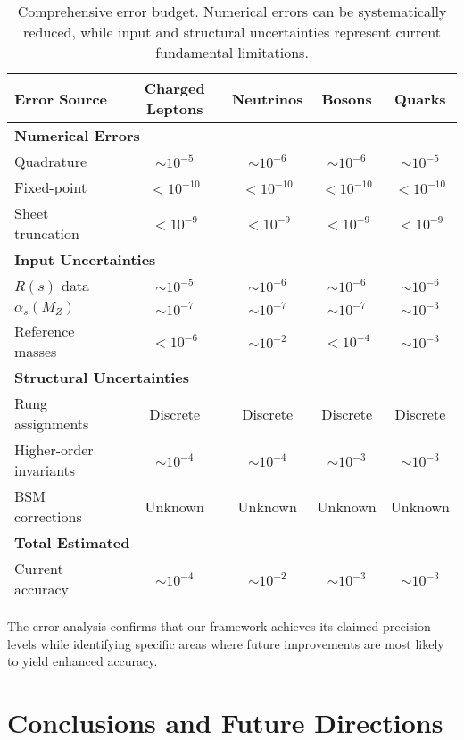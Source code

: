 \documentclass[%
amsmath,amssymb,
aps,
prb,
floatfix,
twocolumn
]{revtex4-2}
\begin{document}
\begin{table}[h]
\centering
\caption{Comprehensive error budget. Numerical errors can be systematically reduced, while input and structural uncertainties represent current fundamental limitations.}
\label{tab:error_budget}
\begin{tabular}{lcccc}
\hline\hline
Error Source & Charged Leptons & Neutrinos & Bosons & Quarks \\
\hline
\multicolumn{5}{l}{\textbf{Numerical Errors}} \\
Quadrature & $\sim 10^{-5}$ & $\sim 10^{-6}$ & $\sim 10^{-6}$ & $\sim 10^{-5}$ \\
Fixed-point & $< 10^{-10}$ & $< 10^{-10}$ & $< 10^{-10}$ & $< 10^{-10}$ \\
Sheet truncation & $< 10^{-9}$ & $< 10^{-9}$ & $< 10^{-9}$ & $< 10^{-9}$ \\
\hline
\multicolumn{5}{l}{\textbf{Input Uncertainties}} \\
$R(s)$ data & $\sim 10^{-5}$ & $\sim 10^{-6}$ & $\sim 10^{-6}$ & $\sim 10^{-6}$ \\
$\alpha_s(M_Z)$ & $\sim 10^{-7}$ & $\sim 10^{-7}$ & $\sim 10^{-7}$ & $\sim 10^{-3}$ \\
Reference masses & $< 10^{-6}$ & $\sim 10^{-2}$ & $< 10^{-4}$ & $\sim 10^{-3}$ \\
\hline
\multicolumn{5}{l}{\textbf{Structural Uncertainties}} \\
Rung assignments & Discrete & Discrete & Discrete & Discrete \\
Higher-order invariants & $\sim 10^{-4}$ & $\sim 10^{-4}$ & $\sim 10^{-3}$ & $\sim 10^{-3}$ \\
BSM corrections & Unknown & Unknown & Unknown & Unknown \\
\hline
\multicolumn{5}{l}{\textbf{Total Estimated}} \\
Current accuracy & $\sim 10^{-4}$ & $\sim 10^{-2}$ & $\sim 10^{-3}$ & $\sim 10^{-3}$ \\
\hline\hline
\end{tabular}
\end{table}

The error analysis confirms that our framework achieves its claimed precision levels while identifying specific areas where future improvements are most likely to yield enhanced accuracy.

\section{Conclusions and Future Directions}
\label{sec:conclude}
\end{document}
